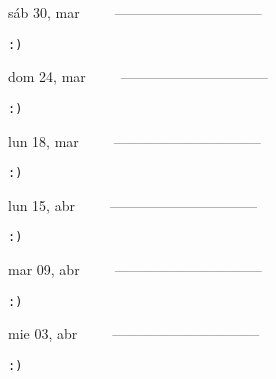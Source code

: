 \documentclass[letterpaper,10pt]{article}
\begin{document}
\begin{multicols}{3}
{sáb 30, mar\ \ \ \ \ --------------------------------}
\begin{flushright}\begin{small}\texttt{:)}\end{small}\end{flushright}
\vfill
{dom 24, mar\ \ \ \ \ --------------------------------}
\begin{flushright}\begin{small}\texttt{:)}\end{small}\end{flushright}\par
\vfill
{lun 18, mar\ \ \ \ \ --------------------------------}
\begin{flushright}\begin{small}\texttt{:)}\end{small}\end{flushright}\par
\vfill
\end{multicols}
\vspace{1.05cm}

\begin{multicols}{3}
{lun 15, abr\ \ \ \ \ --------------------------------}
\begin{flushright}\begin{small}\texttt{:)}\end{small}\end{flushright}
\vfill
{mar 09, abr\ \ \ \ \ --------------------------------}
\begin{flushright}\begin{small}\texttt{:)}\end{small}\end{flushright}\par
\vfill
{mie 03, abr\ \ \ \ \ --------------------------------}
\begin{flushright}\begin{small}\texttt{:)}\end{small}\end{flushright}\par
\vfill
\end{multicols}
\vspace{1.05cm}
\end{document}

